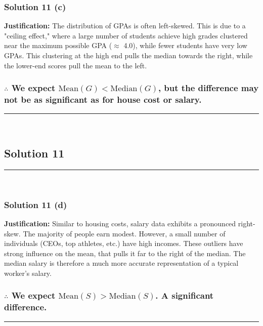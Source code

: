\documentclass{article}
\begin{document}
\subsubsection*{Solution  11 (c)}

\parbox{\textwidth}{
    \textbf{Justification:} The distribution of GPAs is often left-skewed. This is due to a "ceiling effect," where a large number of students achieve high grades clustered near the maximum possible GPA ($\approx$ 4.0), while fewer students have very low GPAs. This clustering at the high end pulls the median towards the right, while the lower-end scores pull the mean to the left.
}

\subsubsection*{\normalfont $\therefore$ We expect $\text{Mean}(G) < \text{Median}(G)$, but the difference may not be as significant as for  house cost or salary.}

\noindent\rule{\textwidth}{0.4pt}\\

\newpage
\subsection*{Solution 11}
\noindent\rule{\textwidth}{0.4pt}\\
\subsubsection*{Solution  11 (d)}

\parbox{\textwidth}{
    \textbf{Justification:} Similar to housing costs, salary data exhibits a pronounced right-skew. The majority of people earn modest. However, a small number of individuals (CEOs, top athletes, etc.) have high incomes. These outliers have strong influence on the mean, that pulls it far to the right of the median. The median salary is therefore a much more accurate representation of a typical worker's salary.
}
\vspace{1em}
\subsubsection*{\normalfont $\therefore$ We expect $\text{Mean}(S) > \text{Median}(S)$. A significant difference.}


\noindent\rule{\textwidth}{0.4pt}\\
\end{document}
